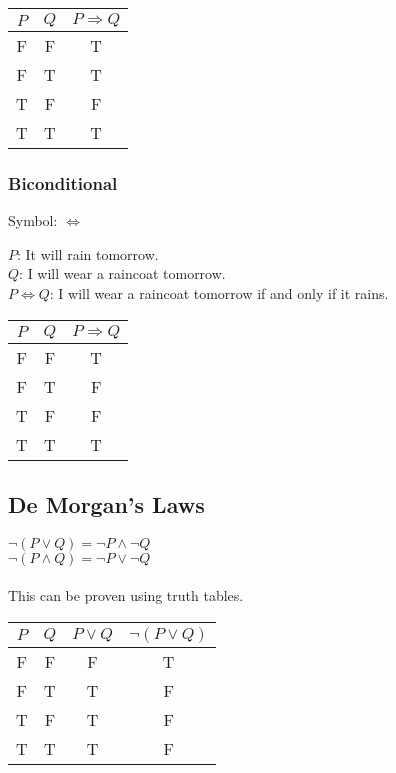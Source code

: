 \documentclass[11pt, oneside]{article}   	%
\begin{document}
\begin{table}[htbp]
   \centering
   \begin{tabular}{@{} cc|c @{}} %
      $P$ & $Q$ & $P \Rightarrow Q$ \\
      \midrule
      F & F & T\\
      F & T & T\\
      T & F & F\\
      T & T & T\\
   \end{tabular}
   \label{tab:booktabs}
\end{table}


\subsubsection{Biconditional}
Symbol: $\Leftrightarrow$

$P$: It will rain tomorrow.\\
$Q$: I will wear a raincoat tomorrow.\\
$P \Leftrightarrow Q$: I will wear a raincoat tomorrow if and only if it rains.
\begin{table}[htbp]
   \centering
   \begin{tabular}{@{} cc|c @{}} %
      $P$ & $Q$ & $P \Rightarrow Q$ \\
      \midrule
      F & F & T\\
      F & T & F\\
      T & F & F\\
      T & T & T\\
   \end{tabular}
   \label{tab:booktabs}
\end{table}


\subsection{De Morgan's Laws}

$\neg(P \vee Q) = \neg P \wedge \neg Q$\\
$\neg(P \wedge Q) = \neg P \vee \neg Q$
\\\\
This can be proven using truth tables.

\begin{table}[htbp]
   \centering
   \begin{tabular}{@{} cc|c|c @{}} %
      $P$ & $Q$ & $P \vee Q$ & $\neg (P \vee Q)$ \\
      \midrule
      F & F & F & T\\
      F & T & T & F\\
      T & F & T & F\\
      T & T & T & F\\
   \end{tabular}
   \label{tab:booktabs}
\end{table}
\end{document}
